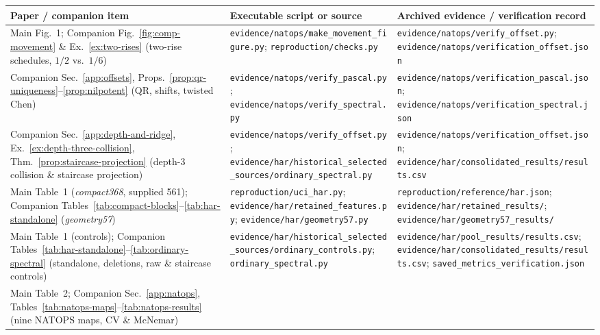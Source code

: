 \begin{table}[ht]
\centering
\small
\begin{tabular}{@{}>{\raggedright\arraybackslash}p{4.3cm}>{\raggedright\arraybackslash}p{4.6cm}>{\raggedright\arraybackslash}p{6.1cm}@{}}
\toprule
Paper / companion item & Executable script or source & Archived evidence / verification record \\
\midrule
Main Fig.~1; Companion Fig.~\ref{fig:comp-movement} \& Ex.~\ref{ex:two-rises} (two-rise schedules, \(1/2\) vs.\ \(1/6\))
  & \nolinkurl{evidence/natops/make_movement_figure.py}; \nolinkurl{reproduction/checks.py}
  & \nolinkurl{evidence/natops/verify_offset.py}; \nolinkurl{evidence/natops/verification_offset.json} \\[4pt]
Companion Sec.~\ref{app:offsets}, Props.~\ref{prop:qr-uniqueness}--\ref{prop:nilpotent} (QR, shifts, twisted Chen)
  & \nolinkurl{evidence/natops/verify_pascal.py}; \nolinkurl{evidence/natops/verify_spectral.py}
  & \nolinkurl{evidence/natops/verification_pascal.json}; \nolinkurl{evidence/natops/verification_spectral.json} \\[4pt]
Companion Sec.~\ref{app:depth-and-ridge}, Ex.~\ref{ex:depth-three-collision}, Thm.~\ref{prop:staircase-projection} (depth-3 collision \& staircase projection)
  & \nolinkurl{evidence/natops/verify_offset.py}; \nolinkurl{evidence/har/historical_selected_sources/ordinary_spectral.py}
  & \nolinkurl{evidence/natops/verification_offset.json}; \nolinkurl{evidence/har/consolidated_results/results.csv} \\[4pt]
Main Table~1 (\emph{compact368}, supplied 561); Companion Tables~\ref{tab:compact-blocks}--\ref{tab:har-standalone} (\emph{geometry57})
  & \nolinkurl{reproduction/uci_har.py}; \nolinkurl{evidence/har/retained_features.py}; \nolinkurl{evidence/har/geometry57.py}
  & \nolinkurl{reproduction/reference/har.json}; \nolinkurl{evidence/har/retained_results/}; \nolinkurl{evidence/har/geometry57_results/} \\[4pt]
Main Table~1 (controls); Companion Tables~\ref{tab:har-standalone}--\ref{tab:ordinary-spectral} (standalone, deletions, raw \& staircase controls)
  & \nolinkurl{evidence/har/historical_selected_sources/ordinary_controls.py}; \nolinkurl{ordinary_spectral.py}
  & \nolinkurl{evidence/har/pool_results/results.csv}; \nolinkurl{evidence/har/consolidated_results/results.csv}; \nolinkurl{saved_metrics_verification.json} \\[4pt]
Main Table~2; Companion Sec.~\ref{app:natops}, Tables~\ref{tab:natops-maps}--\ref{tab:natops-results} (nine NATOPS maps, CV \& McNemar)

\end{tabular}
\end{table}
